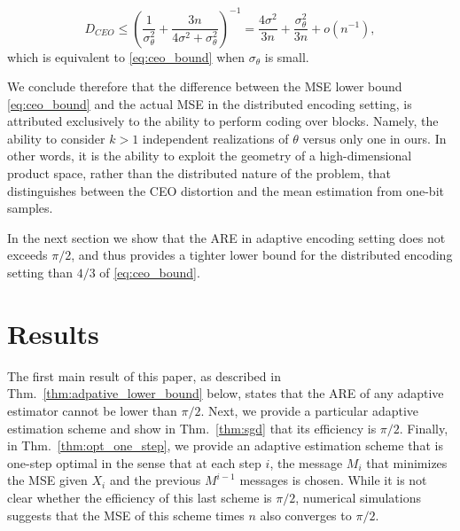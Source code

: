 \documentclass[letterpaper, conference]{IEEEtran}      %
\begin{document}
\[
D_{CEO} \leq  \left( \frac{1}{\sigma_\theta^2} +  \frac{3n}{4\sigma^2 + \sigma_\theta^2} \right)^{-1}   =
\frac{4 \sigma^2}{3n} +  \frac{\sigma_\theta^2}{3n} + o(n^{-1}),
\]
which is equivalent to \eqref{eq:ceo_bound} when $\sigma_\theta$ is small. \par
We conclude therefore that the difference between the MSE lower bound \eqref{eq:ceo_bound} and the actual MSE in the distributed encoding setting, is attributed exclusively to the ability to perform coding over blocks. Namely, the ability to consider $k>1$ independent realizations of $\theta$ versus only one in ours. In other words, it is the ability to exploit the geometry of a high-dimensional product space, rather than the distributed nature of the problem, that distinguishes between the CEO distortion and the mean estimation from one-bit samples.\par
In the next section we show that the ARE in adaptive encoding setting does not exceeds $\pi/2$, and thus provides a tighter lower bound for the distributed encoding setting than $4/3$ of  \eqref{eq:ceo_bound}. 

\section{Results \label{sec:sequential}}
The first main result of this paper, as described in Thm.~\ref{thm:adpative_lower_bound} below, states that the ARE of any adaptive estimator cannot be lower than $\pi/2$. Next, we provide a particular adaptive estimation scheme and show in Thm.~\ref{thm:sgd} that its efficiency is $\pi/2$. Finally, in Thm.~\ref{thm:opt_one_step}, we provide an adaptive estimation scheme that is one-step optimal in the sense that at each step $i$, the message $M_i$ that minimizes the MSE given $X_i$ and the previous $M^{i-1}$ messages is chosen. While it is not clear whether the efficiency of this last scheme is $\pi/2$, numerical simulations suggests that the MSE of this scheme times $n$ also converges to $\pi/2$.

%  
%
%
%
%  
\end{document}
